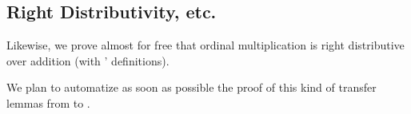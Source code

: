  \subsection{Right Distributivity, etc.}
 Likewise, we prove almost for free that ordinal multiplication is right distributive over addition (with \HydrasLib' definitions).


We plan to automatize as soon as possible the proof of this kind of transfer lemmas from \gaia to \HydrasLib.















